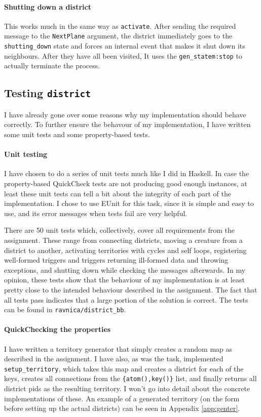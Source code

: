 \paragraph{Shutting down a district} This works much in the same way as \texttt{activate}. After sending the required message to the \texttt{NextPlane} argument, the district immediately goes to the \texttt{shutting\_down} state and forces an internal event that makes it shut down its neighbours. After they have all been visited, It uses the \texttt{gen\_statem:stop} to actually terminate the process.




\subsection*{Testing \texttt{district}}

I have already gone over some reasons why my implementation should behave correctly. To further ensure the behavour of my implementation, I have written some unit tests and some property-based tests.

\paragraph{Unit testing} I have chosen to do a series of unit tests much like I did in Haskell. In case the property-based QuickCheck tests are not producing good enough instances, at least these unit tests can tell a bit about the integrity of each part of the implementation. I chose to use EUnit for this task, since it is simple and easy to use, and its error messages when tests fail are very helpful.

There are 50 unit tests which, collectively, cover all requirements from the assignment. These range from connecting districts, moving a creature from a district to another, activating territories with cycles and self loops, registering well-formed triggers and triggers returning ill-formed data and throwing exceptions, and shutting down while checking the messages afterwards. In my opinion, these tests show that the behaviour of my implementation is at least pretty close to the intended behaviour described in the assignment. The fact that all tests pass indicates that a large portion of the solution is correct. The tests can be found in \texttt{ravnica/district\_bb}.


\paragraph{QuickChecking the properties} I have written a territory generator that simply creates a random map as described in the assignment. I have also, as was the task, implemented \texttt{setup\_territory}, which takes this map and creates a district for each of the keys, creates all connections from the \texttt{\{atom(),key()\}} list, and finally returns all district pids as the resulting territory. I won't go into detail about the concrete implementations of these. An example of a generated territory (on the form before setting up the actual districts) can be seen in Appendix \ref{app:genter}. \\

